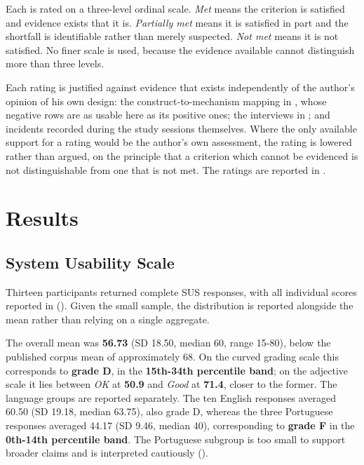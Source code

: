 Each is rated on a three-level ordinal scale. \emph{Met} means the criterion is satisfied and evidence exists that it is. \emph{Partially met} means it is satisfied in part and the shortfall is identifiable rather than merely suspected. \emph{Not met} means it is not satisfied. No finer scale is used, because the evidence available cannot distinguish more than three levels.

Each rating is justified against evidence that exists independently of the author's opinion of his own design: the construct-to-mechanism mapping in , whose negative rows are as usable here as its positive ones; the interviews in ; and incidents recorded during the study sessions themselves. Where the only available support for a rating would be the author's own assessment, the rating is lowered rather than argued, on the principle that a criterion which cannot be evidenced is not distinguishable from one that is not met. The ratings are reported in .

\section{Results}
\label{sec:eval_results}

\subsection{System Usability Scale}
\label{sec:results_sus}

Thirteen participants returned complete \ac{SUS} responses, with all individual scores reported in  (). Given the small sample, the distribution is reported alongside the mean rather than relying on a single aggregate.

The overall mean was \textbf{56.73} (SD 18.50, median 60, range 15-80), below the published corpus mean of approximately 68. On the curved grading scale this corresponds to \textbf{grade D}, in the \textbf{15th-34th percentile band}; on the adjective scale it lies between \emph{OK} at \textbf{50.9} and \emph{Good} at \textbf{71.4}, closer to the former. The language groups are reported separately. The ten English responses averaged 60.50 (SD 19.18, median 63.75), also grade D, whereas the three Portuguese responses averaged 44.17 (SD 9.46, median 40), corresponding to \textbf{grade F} in the \textbf{0th-14th percentile band}. The Portuguese subgroup is too small to support broader claims and is interpreted cautiously ().

